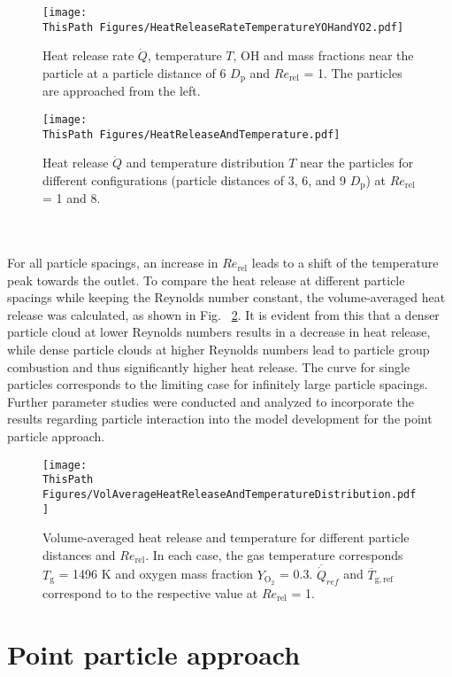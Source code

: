\begin{btUnit}
\begin{figure}
	\texttt{[image: \\ThisPath Figures/HeatReleaseRateTemperatureYOHandYO2.pdf]}
	\caption{Heat release rate $\dot{Q}$, temperature $T$, OH and  mass fractions near the particle at a particle distance of 6 $D_\mathrm{p}$ and $Re_\mathrm{rel}$ = 1. The particles are approached from the left.}\label{fig:B3RFQandT}
\end{figure}
\begin{figure}
	\texttt{[image: \\ThisPath Figures/HeatReleaseAndTemperature.pdf]}
	\caption{Heat release $\dot{Q}$ and temperature distribution $T$ near the particles for different configurations (particle distances of 3, 6, and 9 $D_\mathrm{p}$) at $Re_\mathrm{rel}$ = 1 and 8.}\label{fig:B3RFQandTandOHandO2}
\end{figure}
\\\\
For all particle spacings, an increase in $Re_\mathrm{rel}$ leads to a shift of the temperature peak towards the outlet. To compare the heat release at different particle spacings while keeping the Reynolds number constant, the volume-averaged heat release was calculated, as shown in Fig. ~\ref{fig:B3RFQandTandOHandO2}. It is evident from this that a denser particle cloud at lower Reynolds numbers results in a decrease in heat release, while dense particle clouds at higher Reynolds numbers lead to particle group combustion and thus significantly higher heat release. The curve for single particles corresponds to the limiting case for infinitely large particle spacings. Further parameter studies were conducted and analyzed to incorporate the results regarding particle interaction into the model development for the point particle approach.
\begin{figure}
	\texttt{[image: \\ThisPath Figures/VolAverageHeatReleaseAndTemperatureDistribution.pdf]}
	\caption{Volume-averaged heat release and temperature for different particle distances and $Re_\mathrm{rel}$. In each case, the gas temperature corresponds $T_\mathrm{g}$ = 1496 K and oxygen mass fraction $Y_\mathrm{O_2}$ = 0.3. $\overline{\dot{Q}}_{ref}$ and $\overline{T}_\mathrm{g,ref}$ correspond to to the respective value at $Re_\mathrm{rel}$ = 1.}\label{fig:B3VolQandT}
\end{figure}




\section{Point particle approach}


\end{btUnit}
